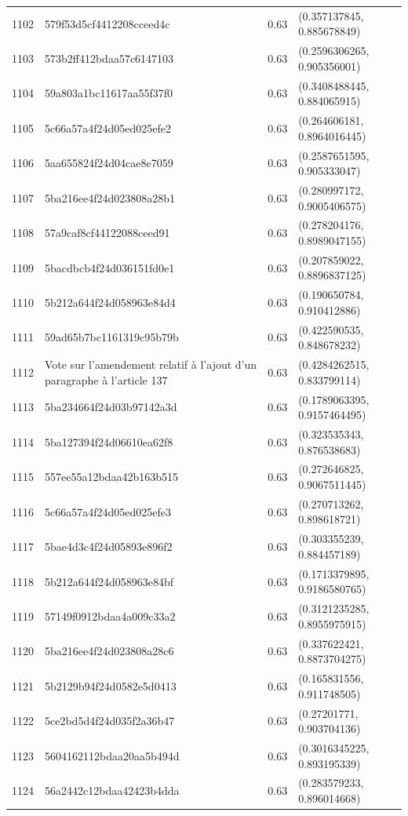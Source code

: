 \begin{table}[ht]
\begin{tabular}{rlrl}
  1102 & 579f53d5cf4412208cceed4c & 0.63 & (0.357137845, 0.885678849) \\ 
  1103 & 573b2ff412bdaa57c6147103 & 0.63 & (0.2596306265, 0.905356001) \\ 
  1104 & 59a803a1bc11617aa55f37f0 & 0.63 & (0.3408488445, 0.884065915) \\ 
  1105 & 5c66a57a4f24d05ed025efe2 & 0.63 & (0.264606181, 0.8964016445) \\ 
  1106 & 5aa655824f24d04cae8e7059 & 0.63 & (0.2587651595, 0.905333047) \\ 
  1107 & 5ba216ee4f24d023808a28b1 & 0.63 & (0.280997172, 0.9005406575) \\ 
  1108 & 57a9caf8cf44122088ceed91 & 0.63 & (0.278204176, 0.8989047155) \\ 
  1109 & 5bacdbcb4f24d036151fd0e1 & 0.63 & (0.207859022, 0.8896837125) \\ 
  1110 & 5b212a644f24d058963e84d4 & 0.63 & (0.190650784, 0.910412886) \\ 
  1111 & 59ad65b7bc1161319c95b79b & 0.63 & (0.422590535, 0.848678232) \\ 
  1112 & Vote sur l'amendement relatif à l'ajout d'un paragraphe à l'article 137 & 0.63 & (0.4284262515, 0.833799114) \\ 
  1113 & 5ba234664f24d03b97142a3d & 0.63 & (0.1789063395, 0.9157464495) \\ 
  1114 & 5ba127394f24d06610ea62f8 & 0.63 & (0.323535343, 0.876538683) \\ 
  1115 & 557ee55a12bdaa42b163b515 & 0.63 & (0.272646825, 0.9067511445) \\ 
  1116 & 5c66a57a4f24d05ed025efe3 & 0.63 & (0.270713262, 0.898618721) \\ 
  1117 & 5bae4d3c4f24d05893e896f2 & 0.63 & (0.303355239, 0.884457189) \\ 
  1118 & 5b212a644f24d058963e84bf & 0.63 & (0.1713379895, 0.9186580765) \\ 
  1119 & 57149f0912bdaa4a009c33a2 & 0.63 & (0.3121235285, 0.8955975915) \\ 
  1120 & 5ba216ee4f24d023808a28c6 & 0.63 & (0.337622421, 0.8873704275) \\ 
  1121 & 5b2129b94f24d0582e5d0413 & 0.63 & (0.165831556, 0.911748505) \\ 
  1122 & 5ce2bd5d4f24d035f2a36b47 & 0.63 & (0.27201771, 0.903704136) \\ 
  1123 & 5604162112bdaa20aa5b494d & 0.63 & (0.3016345225, 0.893195339) \\ 
  1124 & 56a2442c12bdaa42423b4dda & 0.63 & (0.283579233, 0.896014668) \\ 

\end{tabular}
\end{table}

